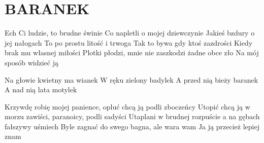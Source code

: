 \documentclass[../../../songbook.tex]{subfiles}
\begin{document}
\TabPositions{8cm} %
\section*{BARANEK}
{}
\vspace{0.5cm}

Ech Ci ludzie, to brudne świnie			 \newline
Co napletli o mojej dziewczynie			 \newline
Jakieś bzdury o jej nałogach			 \newline
To po prostu litość i trwoga			 \newline
Tak to bywa gdy ktoś zazdrości			 \newline
Kiedy brak mu własnej miłości			 \newline
Plotki płodzi, mnie nie zaszkodzi żadne obce zło	 \newline
Na mój sposób widzieć ją			 \newline

\-\hspace{1cm} Na głowie kwietny ma wianek	 \newline
\-\hspace{1cm} W ręku zielony badylek		 \newline
\-\hspace{1cm} A przed nią bieży baranek	 \newline
\-\hspace{1cm} A nad nią lata motylek		 \newline

Krzywdę robię mojej panience, opluć chcą ją podli zboczeńcy			\newline
Utopić chcą ją w morzu zawiści, paranoicy, podli sadyści			\newline
Utaplani w brudnej rozpuście a na gębach fałszywy uśmiech			\newline
Byle zagnać do swego bagna, ale wara wam							\newline
Ja ją przecież lepiej znam											\newline
\end{document}
